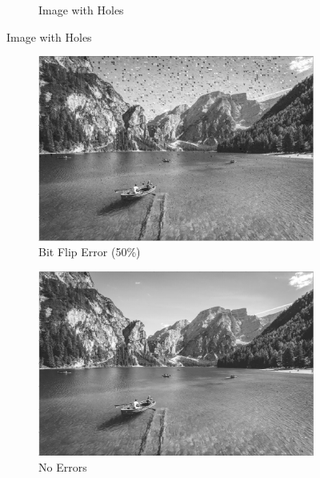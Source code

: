 \documentclass[landscape,a0paper,fontscale=0.5]{baposter} %
\begin{document}
\begin{poster}
{\begin{figure}[H]
\begin{subfigure}{0.3\textwidth}
		\caption{Image with Holes} %
	\end{subfigure}
\end{figure}
\vspace{-3em}
\begin{figure}[H]
	\centering
	\begin{subfigure}{0.3\textwidth} %
		\includegraphics[scale=0.085]{7Land.jpg}
		\caption{Bit Flip Error (50\%)} %
	\end{subfigure}
	\vspace{1em} %
	\begin{subfigure}{0.3\textwidth} %
		\includegraphics[scale=0.085]{8Land.jpg}
		\caption{No Errors} %
	\end{subfigure}
	\begin{subfigure}{0.3\textwidth} %

\end{subfigure}
\end{figure}}
\end{poster}
\end{document}
